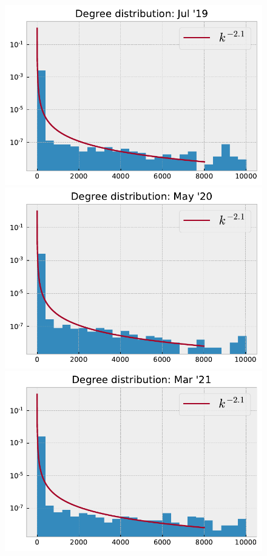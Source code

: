 \documentclass[10pt,a4paper]{article}
\begin{document}
\begin{figure}[h]
\begin{minipage}[t]{.33\textwidth}
\end{minipage}\\
\begin{minipage}[t]{.33\textwidth}
\includegraphics[scale=0.4]{figures/degree_dist_jul_19.pdf}
\end{minipage}%
\begin{minipage}[t]{.33\textwidth}
\includegraphics[scale=0.4]{figures/degree_dist_may_20.pdf}
\end{minipage}
\begin{minipage}[t]{.33\textwidth}
\includegraphics[scale=0.4]{figures/degree_dist_mar_21.pdf}

\end{minipage}
\end{figure}
\end{document}
